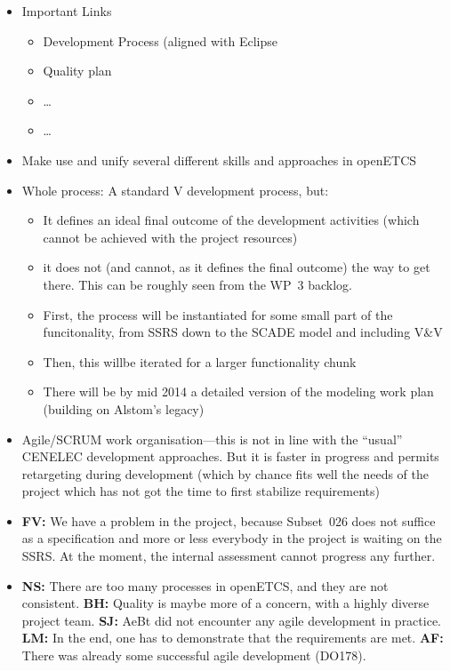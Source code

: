 \documentclass[a4paper,german]{article}
\begin{document}
\begin{itemize}
\item Important Links
  \begin{itemize}
  \item Development Process (aligned with Eclipse
  \item Quality plan
  \item \ldots
  \item \ldots
  \end{itemize}
\item Make use and unify several different skills and approaches in openETCS
\item Whole process: A standard V development process, but:
  \begin{itemize}
  \item It defines an ideal final outcome of the development activities
    (which cannot be achieved with the project resources)
  \item it does not (and cannot, as it defines the final outcome) the
    way to get there. This can be roughly seen from the WP~3 backlog.
  \item First, the process will be instantiated for some small part of
    the funcitonality, from SSRS down to the SCADE model and including V\&V
  \item Then, this willbe iterated for a larger functionality chunk
  \item There will be by mid 2014 a detailed version of the modeling
    work plan (building on Alstom's legacy)
  \end{itemize}
\item Agile/SCRUM work organisation---this is not in line with the
  ``usual'' CENELEC development approaches. But it is faster in
  progress and permits retargeting during development (which by chance
  fits well the needs of the project which has not got the time to
  first stabilize requirements)
\item \textbf{FV:} We have a problem in the project, because
  Subset~026 does not suffice as a specification and more or less
  everybody in the project is waiting on the SSRS. At the moment, the
  internal assessment cannot progress any further.
\item \textbf{NS:} There are too many processes in openETCS, and they
  are not consistent. \textbf{BH:} Quality is maybe more of a concern,
  with a highly diverse project team. \textbf{SJ:} AeBt did not
  encounter any agile development in practice. \textbf{LM:} In the
  end, one has to demonstrate that the requirements are
  met. \textbf{AF:} There was already some successful agile
  development (DO178). 

\end{itemize}
\end{document}
